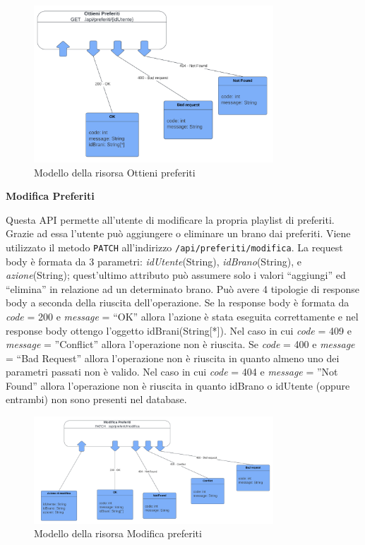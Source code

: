 \documentclass[a4paper,12pt]{article}
\begin{document}
\begin{figure}[htp]
    \centering
    \includegraphics[width=0.8\textwidth]{resource-models/ottieni-preferiti.png}
    \caption{Modello della risorsa Ottieni preferiti}
\end{figure}

\textbf{Modifica Preferiti}

Questa API permette all’utente di modificare la propria playlist di preferiti. Grazie ad essa l’utente può aggiungere o eliminare un brano dai preferiti. Viene utilizzato il metodo \texttt{PATCH} all’indirizzo \texttt{/api/preferiti/modifica}. \newline
La request body è formata da 3 parametri: \textit{idUtente}(String), \textit{idBrano}(String), e \textit{azione}(String); quest’ultimo attributo può assumere solo i valori “aggiungi” ed “elimina” in relazione ad un determinato brano. \newline
Può avere 4 tipologie di response body a seconda della riuscita dell’operazione. \newline
Se la response body è formata da \textit{code} = 200 e \textit{message} = “OK” allora l'azione è stata eseguita correttamente e nel response body ottengo l’oggetto idBrani(String[*]). \newline
Nel caso in cui \textit{code} = 409  e \textit{message} = ”Conflict” allora l’operazione non è riuscita. \newline
Se \textit{code} = 400 e \textit{message} = “Bad Request” allora l’operazione non è riuscita in quanto almeno uno dei parametri passati non è valido. \newline
Nel caso in cui \textit{code} = 404  e \textit{message} = ”Not Found” allora l’operazione non è riuscita in quanto idBrano o idUtente (oppure entrambi) non sono presenti nel database.

\begin{figure}[htp]
    \centering
    \includegraphics[width=0.8\textwidth]{resource-models/modifica-preferiti.png}
    \caption{Modello della risorsa Modifica preferiti}
\end{figure}
\end{document}
